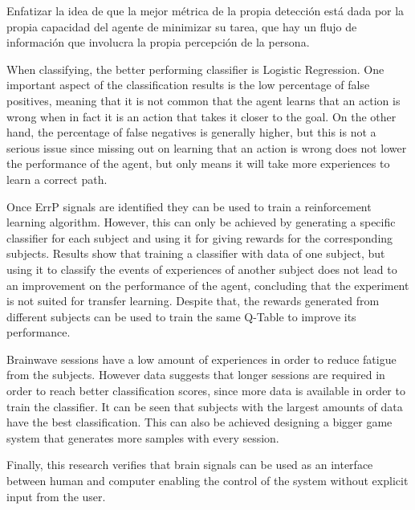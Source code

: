 \documentclass[journal]{IEEEtran}
\begin{document}
Enfatizar la idea de que la mejor métrica de la propia detección está dada por la propia capacidad del agente de minimizar su tarea, que hay un flujo de información que involucra la propia percepción de la persona.

When classifying, the better performing classifier is Logistic Regression. One important aspect of the classification results is the low percentage of false positives, meaning that it is not common that the agent learns that an action is wrong when in fact it is an action that takes it closer to the goal. On the other hand, the percentage of false negatives is generally higher, but this is not a serious issue since missing out on learning that an action is wrong does not lower the performance of the agent, but only means it will take more experiences to learn a correct path.

Once ErrP signals are identified they can be used to train a reinforcement learning algorithm. However, this can only be achieved by generating a specific classifier for each subject and using it for giving rewards for the corresponding subjects. Results show that training a classifier with data of one subject, but using it to classify the events of experiences of another subject does not lead to an improvement on the performance of the agent, concluding that the experiment is not suited for transfer learning. Despite that, the rewards generated from different subjects can be used to train the same Q-Table to improve its performance.

Brainwave sessions have a low amount of experiences in order to reduce fatigue from the subjects. However data suggests that longer sessions are required in order to reach better classification scores, since more data is available in order to train the classifier. It can be seen that subjects with the largest amounts of data have the best classification. This can also be achieved designing a bigger game system that generates more samples with every session.

Finally, this research verifies that brain signals can be used as an interface between human and computer enabling the control of the system without explicit input from the user.



\end{document}
